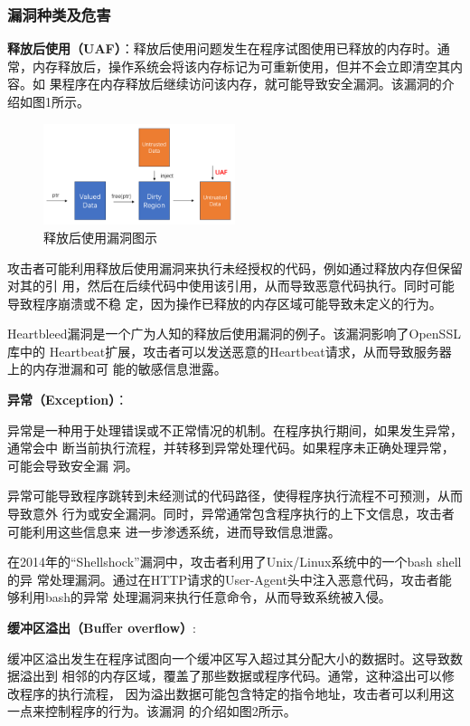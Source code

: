 \subsubsection{漏洞种类及危害}
\textbf{释放后使用（UAF）}：释放后使用问题发生在程序试图使用已释放的内存时。通
	常，内存释放后，操作系统会将该内存标记为可重新使用，但并不会立即清空其内容。如
	果程序在内存释放后继续访问该内存，就可能导致安全漏洞。该漏洞的介绍如图1所示。
	\begin{figure}[htbp]
		\centering
		\includegraphics[width=0.5\textwidth]{pictures/UAF.png}
		\caption{释放后使用漏洞图示}
		\label{fig:UAF}
	\end{figure}
攻击者可能利用释放后使用漏洞来执行未经授权的代码，例如通过释放内存但保留对其的引
用，然后在后续代码中使用该引用，从而导致恶意代码执行。同时可能导致程序崩溃或不稳
定，因为操作已释放的内存区域可能导致未定义的行为。

Heartbleed漏洞是一个广为人知的释放后使用漏洞的例子。该漏洞影响了OpenSSL库中的
Heartbeat扩展，攻击者可以发送恶意的Heartbeat请求，从而导致服务器上的内存泄漏和可
能的敏感信息泄露。

\textbf{异常（Exception）}：
	
异常是一种用于处理错误或不正常情况的机制。在程序执行期间，如果发生异常，通常会中
断当前执行流程，并转移到异常处理代码。如果程序未正确处理异常，可能会导致安全漏
洞。

异常可能导致程序跳转到未经测试的代码路径，使得程序执行流程不可预测，从而导致意外
行为或安全漏洞。同时，异常通常包含程序执行的上下文信息，攻击者可能利用这些信息来
进一步渗透系统，进而导致信息泄露。

在2014年的``Shellshock''漏洞中，攻击者利用了Unix/Linux系统中的一个bash shell的异
常处理漏洞。通过在HTTP请求的User-Agent头中注入恶意代码，攻击者能够利用bash的异常
处理漏洞来执行任意命令，从而导致系统被入侵。
	
\textbf{缓冲区溢出（Buffer overflow）}:
	
缓冲区溢出发生在程序试图向一个缓冲区写入超过其分配大小的数据时。这导致数据溢出到
相邻的内存区域，覆盖了那些数据或程序代码。通常，这种溢出可以修改程序的执行流程，
因为溢出数据可能包含特定的指令地址，攻击者可以利用这一点来控制程序的行为。该漏洞
的介绍如图2所示。
	
